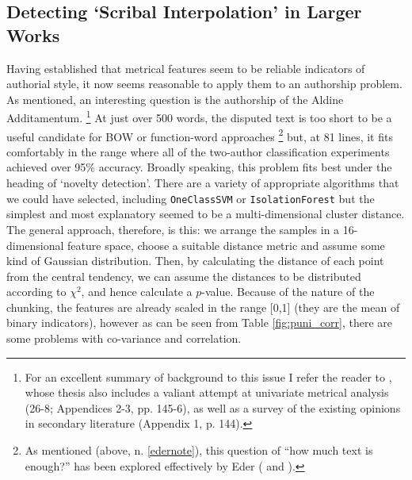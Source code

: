 \documentclass[11pt,a4paper]{scrartcl} %
\begin{document}
{\subsection{Detecting `Scribal Interpolation' in Larger Works}

Having established that metrical features seem to be reliable indicators of authorial style, it now seems reasonable to apply them to an authorship problem. As mentioned, an interesting question is the authorship of the Aldine Additamentum.%
\footnote{For an excellent summary of background to this issue I refer the reader to , whose thesis also includes a valiant attempt at univariate metrical analysis (26-8; Appendices 2-3, pp. 145-6), as well as a survey of the existing opinions in secondary literature (Appendix 1, p. 144).\label{leenote}}
At just over 500 words, the disputed text is too short to be a useful candidate for BOW or function-word approaches%
\footnote{As mentioned (above, n. \ref{edernote}), this question of ``how much text is enough?'' has been explored effectively by Eder ( and ).}
but, at 81 lines, it fits comfortably in the range where all of the two-author classification experiments achieved over 95\% accuracy. Broadly speaking, this problem fits best under the heading of `novelty detection'. There are a variety of appropriate algorithms that we could have selected, including \texttt{OneClassSVM} or \texttt{IsolationForest} but the simplest and most explanatory seemed to be a multi-dimensional cluster distance. The general approach, therefore, is this: we arrange the samples in a 16-dimensional feature space, choose a suitable distance metric and assume some kind of Gaussian distribution. Then, by calculating the distance of each point from the central tendency, we can assume the distances to be distributed according to $\chi^{2}$, and hence calculate a $p$-value. Because of the nature of the chunking, the features are already scaled in the range [0,1] (they are the mean of binary indicators), however as can be seen from Table \ref{fig:puni_corr}, there are some problems with co-variance and correlation.
\begin{table}
\caption{Some highly correlated features in Silius' \textit{Punica}}
\label{fig:puni_corr}
\phantom{x}
\centering
{}
\end{table}}
\end{document}
